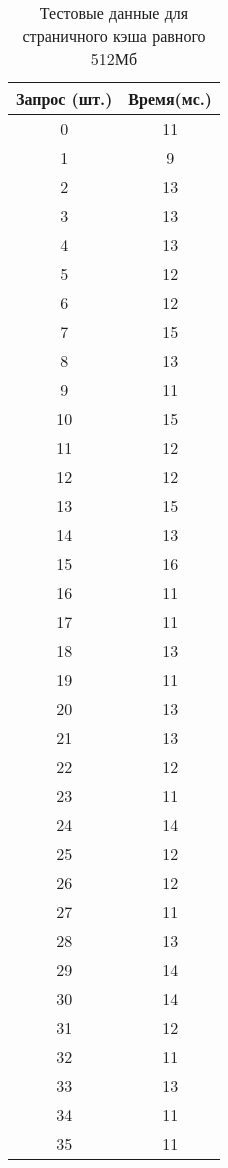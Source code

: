 \begin{table}[H]
	\begin{minipage}{.4\textwidth}
		\centering
		\caption{Тестовые данные для страничного кэша равного 512Мб}
		\begin{tabular}{|c|c|}
			\hline
			Запрос (шт.) & Время(мс.) \\
			\hline
			0   & 11 \\
			1   & 9  \\
			2   & 13 \\
			3   & 13 \\
			4   & 13 \\
			5   & 12 \\
			6   & 12 \\
			7   & 15 \\
			8   & 13 \\
			9   & 11 \\
			10  & 15 \\
			11  & 12 \\
			12  & 12 \\
			13  & 15 \\
			14  & 13 \\
			15  & 16 \\
			16  & 11 \\
			17  & 11 \\
			18  & 13 \\
			19  & 11 \\
			20  & 13 \\
			21  & 13 \\
			22  & 12 \\
			23  & 11 \\
			24  & 14 \\
			25  & 12 \\
			26  & 12 \\
			27  & 11 \\
			28  & 13 \\
			29  & 14 \\
			30  & 14 \\
			31  & 12 \\
			32  & 11 \\
			33  & 13 \\
			34  & 11 \\
			35  & 11 \\
			\hline
		\end{tabular}
	\end{minipage}
	\hfill
	\begin{minipage}{.4\textwidth}
		\centering
		\caption{Тестовые данные для страничного кэша равного 512Мб}

\end{minipage}
\end{table}
